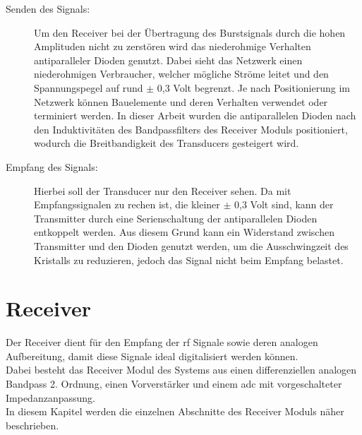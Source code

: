 \begin{description}
\item[Senden des Signals:] Um den Receiver bei der Übertragung des Burstsignals durch die hohen Amplituden nicht zu zerstören wird das niederohmige Verhalten antiparalleler Dioden genutzt. Dabei sieht das Netzwerk einen niederohmigen Verbraucher, welcher mögliche Ströme leitet und den Spannungspegel auf rund $\pm$ 0,3 Volt begrenzt. Je nach Positionierung im Netzwerk können Bauelemente und deren Verhalten verwendet oder terminiert werden. In dieser Arbeit wurden die antiparallelen Dioden nach den Induktivitäten des Bandpassfilters des Receiver Moduls positioniert, wodurch die Breitbandigkeit des Transducers gesteigert wird.
\item[Empfang des Signals:] Hierbei soll der Transducer nur den Receiver sehen. Da mit Empfangssignalen zu rechen ist, die kleiner $\pm$ 0,3 Volt sind, kann der Transmitter durch eine Serienschaltung der antiparallelen Dioden entkoppelt werden. Aus diesem Grund kann ein Widerstand zwischen Transmitter und den Dioden genutzt werden, um die Ausschwingzeit des Kristalls zu reduzieren, jedoch das Signal nicht beim Empfang belastet.
\end{description}
\section{Receiver}\label{sec:receiver}
Der Receiver dient für den Empfang der \ac{rf} Signale sowie deren analogen Aufbereitung, damit diese Signale ideal digitalisiert werden können.\\
Dabei besteht das Receiver Modul des Systems aus einen differenziellen analogen Bandpass 2. Ordnung, einen Vorverstärker und einem \ac{adc} mit vorgeschalteter Impedanzanpassung.\\
In diesem Kapitel werden die einzelnen Abschnitte des Receiver Moduls näher beschrieben.

